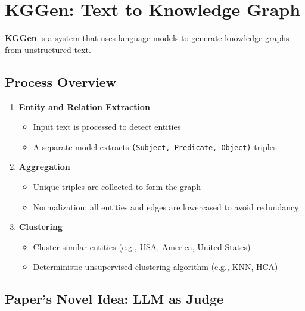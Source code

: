 \documentclass[12pt]{article}
\begin{document}
\section{KGGen: Text to Knowledge Graph}

\textbf{KGGen} is a system that uses language models to generate knowledge graphs from unstructured text.

\subsection*{Process Overview}

\begin{enumerate}
    \item \textbf{Entity and Relation Extraction}
    \begin{itemize}
        \item Input text is processed to detect entities
        \item A separate model extracts \texttt{(Subject, Predicate, Object)} triples
    \end{itemize}
    
    \item \textbf{Aggregation}
    \begin{itemize}
        \item Unique triples are collected to form the graph
        \item Normalization: all entities and edges are lowercased to avoid redundancy
    \end{itemize}

    \item \textbf{Clustering}
    \begin{itemize}
        \item Cluster similar entities (e.g., USA, America, United States)
        \item Deterministic unsupervised clustering algorithm (e.g., KNN, HCA)
    \end{itemize}
\end{enumerate}

\subsection*{Paper's Novel Idea: LLM as Judge}
\end{document}
